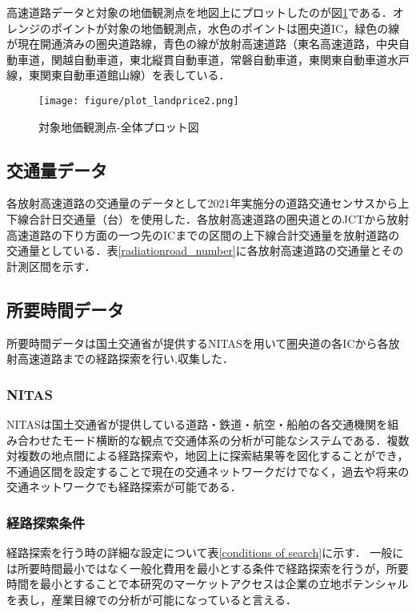 高速道路データと対象の地価観測点を地図上にプロットしたのが図\ref{plot_landprice}である．オレンジのポイントが対象の地価観測点，水色のポイントは圏央道IC，緑色の線が現在開通済みの圏央道路線，青色の線が放射高速道路（東名高速道路，中央自動車道，関越自動車道，東北縦貫自動車道，常磐自動車道，東関東自動車道水戸線，東関東自動車道館山線）を表している．
\begin{figure}[H]
  \centering
  \texttt{[image: figure/plot\_landprice2.png]}
  \caption{対象地価観測点-全体プロット図}
  \label{plot_landprice}
\end{figure}

\subsection{交通量データ}
各放射高速道路の交通量のデータとして2021年実施分の道路交通センサスから上下線合計日交通量（台）を使用した．各放射高速道路の圏央道とのJCTから放射高速道路の下り方面の一つ先のICまでの区間の上下線合計交通量を放射道路の交通量としている．表\ref{radiationroad_number}に各放射高速道路の交通量とその計測区間を示す．


\subsection{所要時間データ}
所要時間データは国土交通省が提供するNITASを用いて圏央道の各ICから各放射高速道路までの経路探索を行い,収集した．

\subsubsection{NITAS}
NITASは国土交通省が提供している道路・鉄道・航空・船舶の各交通機関を組み合わせたモード横断的な観点で交通体系の分析が可能なシステムである．複数対複数の地点間による経路探索や，地図上に探索結果等を図化することができ，不通過区間を設定することで現在の交通ネットワークだけでなく，過去や将来の交通ネットワークでも経路探索が可能である．\cite{NITAS}

\subsubsection{経路探索条件}
経路探索を行う時の詳細な設定について表\ref{conditions of search}に示す．
一般には所要時間最小ではなく一般化費用を最小とする条件で経路探索を行うが，所要時間を最小とすることで本研究のマーケットアクセスは企業の立地ポテンシャルを表し，産業目線での分析が可能になっていると言える．


